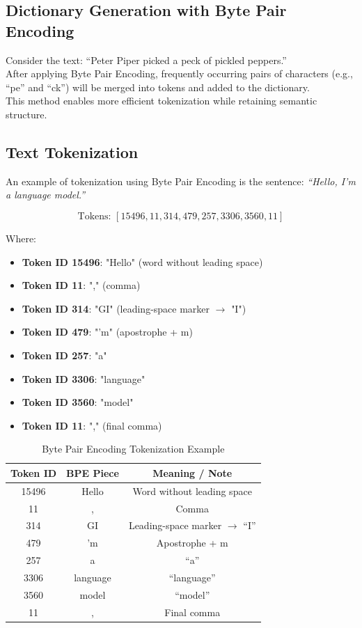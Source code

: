 \documentclass[11pt,a4paper]{article}
\theoremstyle{definition}
\theoremstyle{plain}
\theoremstyle{remark}
\begin{document}
\subsection{Dictionary Generation with Byte Pair Encoding}

Consider the text: ``Peter Piper picked a peck of pickled peppers.''\\
After applying Byte Pair Encoding, frequently occurring pairs of characters (e.g., ``pe'' and ``ck'') will be merged into tokens and added to the dictionary.\\
This method enables more efficient tokenization while retaining semantic structure.

\subsection{Text Tokenization}

An example of tokenization using Byte Pair Encoding is the sentence: \textit{``Hello, I’m a language model.''}

\[
\text{Tokens: } [15496, 11, 314, 479, 257, 3306, 3560, 11]
\]

Where:
\begin{itemize}
    \item \textbf{Token ID 15496}: "Hello" (word without leading space)
    \item \textbf{Token ID 11}: "," (comma)
    \item \textbf{Token ID 314}: "GI" (leading-space marker $\rightarrow$ "I")
    \item \textbf{Token ID 479}: "'m" (apostrophe + m)
    \item \textbf{Token ID 257}: "a"
    \item \textbf{Token ID 3306}: "language"
    \item \textbf{Token ID 3560}: "model"
    \item \textbf{Token ID 11}: "," (final comma)
\end{itemize}

\begin{table}[h!]
\centering
\begin{tabular}{|c|c|c|}
\hline
\textbf{Token ID} & \textbf{BPE Piece} & \textbf{Meaning / Note} \\
\hline
15496 & Hello & Word without leading space \\
11 & , & Comma \\
314 & GI & Leading-space marker $\rightarrow$ ``I'' \\
479 & 'm & Apostrophe + m \\
257 & a & ``a'' \\
3306 & language & ``language'' \\
3560 & model & ``model'' \\
11 & , & Final comma \\
\hline
\end{tabular}
\caption{Byte Pair Encoding Tokenization Example}
\end{table}
\end{document}
